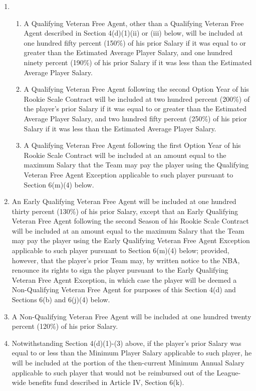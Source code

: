 \documentclass[
]{book}
\providecommand{\tightlist}{%
  \setlength{\itemsep}{0pt}\setlength{\parskip}{0pt}}
\begin{document}
\begin{enumerate}
  \begin{enumerate}
  \def\labelenumii{(\arabic{enumii})}
  \item
    \begin{enumerate}
    \def\labelenumiii{(\roman{enumiii})}
    \tightlist
    \item
      A Qualifying Veteran Free Agent, other than a Qualifying Veteran Free Agent described in Section 4(d)(1)(ii) or (iii) below, will be included at one hundred fifty percent (150\%) of his prior Salary if it was equal to or greater than the Estimated Average Player Salary, and one hundred ninety percent (190\%) of his prior Salary if it was less than the Estimated Average Player Salary.
    \item
      A Qualifying Veteran Free Agent following the second Option Year of his Rookie Scale Contract will be included at two hundred percent (200\%) of the player's prior Salary if it was equal to or greater than the Estimated Average Player Salary, and two hundred fifty percent (250\%) of his prior Salary if it was less than the Estimated Average Player Salary.
    \item
      A Qualifying Veteran Free Agent following the first Option Year of his Rookie Scale Contract will be included at an amount equal to the maximum Salary that the Team may pay the player using the Qualifying Veteran Free Agent Exception applicable to such player pursuant to Section 6(m)(4) below.
    \end{enumerate}
  \item
    An Early Qualifying Veteran Free Agent will be included at one hundred thirty percent (130\%) of his prior Salary, except that an Early Qualifying Veteran Free Agent following the second Season of his Rookie Scale Contract will be included at an amount equal to the maximum Salary that the Team may pay the player using the Early Qualifying Veteran Free Agent Exception applicable to such player pursuant to Section 6(m)(4) below; provided, however, that the player's prior Team may, by written notice to the NBA, renounce its rights to sign the player pursuant to the Early Qualifying Veteran Free Agent Exception, in which case the player will be deemed a Non-Qualifying Veteran Free Agent for purposes of this Section 4(d) and Sections 6(b) and 6(j)(4) below.
  \item
    A Non-Qualifying Veteran Free Agent will be included at one hundred twenty percent (120\%) of his prior Salary.
  \item
    Notwithstanding Section 4(d)(1)-(3) above, if the player's prior Salary was equal to or less than the Minimum Player Salary applicable to such player, he will be included at the portion of the then-current Minimum Annual Salary applicable to such player that would not be reimbursed out of the League-wide benefits fund described in Article IV, Section 6(k).

\end{enumerate}
\end{enumerate}
\end{document}
